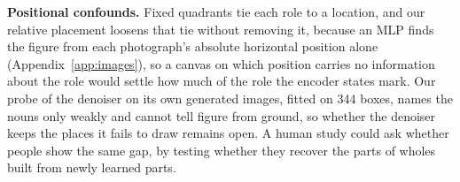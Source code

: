 \textbf{Positional confounds.} Fixed quadrants tie each role to a location, and our relative placement loosens that tie without removing it, because an MLP finds the figure from each photograph's absolute horizontal position alone (Appendix~\ref{app:images}), so a canvas on which position carries no information about the role would settle how much of the role the encoder states mark. Our probe of the denoiser on its own generated images, fitted on 344 boxes, names the nouns only weakly and cannot tell figure from ground, so whether the denoiser keeps the places it fails to draw remains open. A human study could ask whether people show the same gap, by testing whether they recover the parts of wholes built from newly learned parts.
